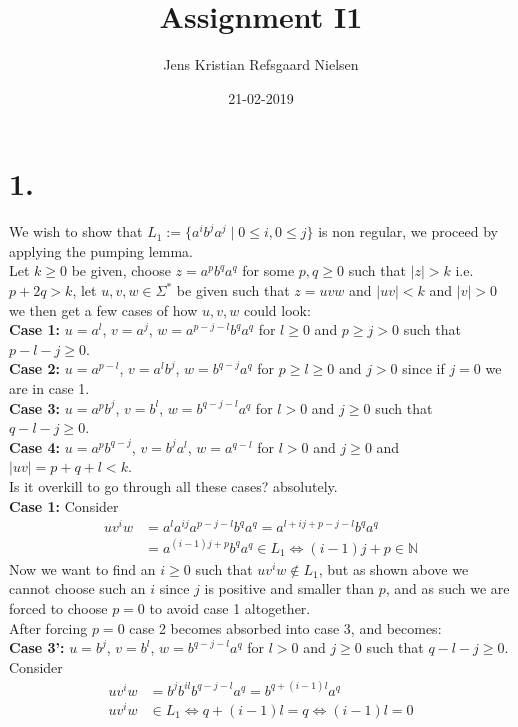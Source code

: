 \documentclass{article}
\theoremstyle{remark}
\numberwithin{equation}{section}
\begin{document}
	\author{Jens Kristian Refsgaard Nielsen}
	\title{Assignment I1}
	\date{21-02-2019}
	\maketitle
\section*{1.}
We wish to show that $L_1 := \{ a^i b^j a^j\mid 0\leq i , 0\leq j \}$ is non regular, we proceed by applying the pumping lemma.\\Let $k\geq 0$ be given, choose $z = a^p b^q a^q $ for some $p,q\geq0$ such that $|z|> k$ i.e. $p+2q>k$, let $u,v,w \in\Sigma^*$ be given such that $z=uvw$ and $|uv|< k$ and $|v| > 0 $ we then get a few cases of how $u,v,w$ could look:
\\\textbf{Case 1:} $u = a^l$, $v = a^j$, $w = a^{p-j-l}b^qa^q$ for $l\geq 0$ and $p\geq j>0$ such that $p-l-j\geq 0$.
\\\textbf{Case 2:} $u = a^{p-l}$, $v = a^{l} b^j$, $w = b^{q-j}a^q$ for $p\geq l\geq0$ and $j>0$ since if $j=0$ we are in case 1.
\\\textbf{Case 3:} $u = a^pb^j$, $v = b^l$, $w = b^{q-j-l}a^q$ for $l>0$ and $j\geq 0$ such that $q-l-j\geq 0$.
\\\textbf{Case 4:} $u = a^pb^{q-j}$, $v = b^{j}a^l$, $w = a^{q-l}$ for $l>0$ and $j\geq 0$ and $|uv|=p+q+l < k$.
\\Is it overkill to go through all these cases? absolutely.
\\\textbf{Case 1:} Consider
\begin{align*}
	uv^iw &= a^l a^{ij} a^{p-j-l}b^qa^q = a^{l+ij+p-j-l}b^qa^q 
	\\&= a^{(i-1)j+p}b^qa^q \in L_1	\iff (i-1)j+p \in \mathbb{N}
\end{align*}
Now we want to find an $i\geq 0$ such that $uv^iw\notin L_1$, but as shown above we cannot choose such an $i$ since $j$ is positive and smaller than $p$, and as such we are forced to choose $p=0$ to avoid case 1 altogether.
\\After forcing $p=0$ case 2 becomes absorbed into case 3, and becomes:
\\\textbf{Case 3':} $u = b^j$, $v = b^l$, $w = b^{q-j-l}a^q$ for $l>0$ and $j\geq 0$ such that $q-l-j\geq 0$. Consider
\begin{align*}
	uv^iw &= b^j b^{il} b^{q-j-l} a^q = b^{q+(i-1)l} a^q \\
	uv^iw &\in L_1 \iff q+(i-1)l = q \iff (i-1)l = 0
\end{align*}
\end{document}
